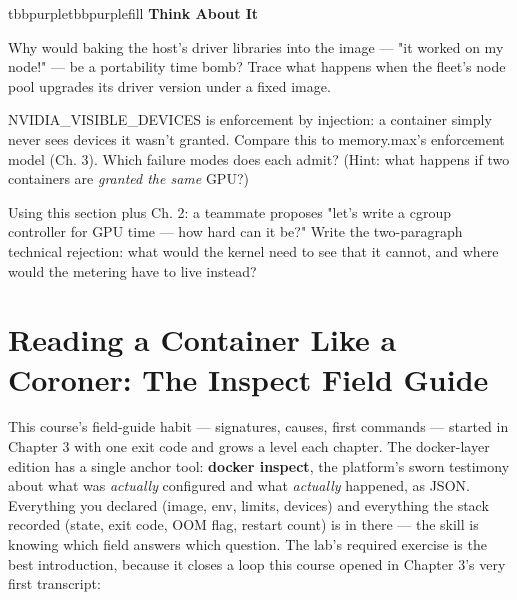 \begin{calloutbox}{tbbpurple}{tbbpurplefill}
{\normalsize\bfseries\color{tbbpurple}Think About It}\par\vspace{3pt}
\begin{tbbitemize}
  \item Why would baking the host's driver libraries into the image — "it worked on my node!" — be a portability time bomb? Trace what happens when the fleet's node pool upgrades its driver version under a fixed image.
  \item NVIDIA\_VISIBLE\_DEVICES is enforcement by injection: a container simply never sees devices it wasn't granted. Compare this to memory.max's enforcement model (Ch. 3). Which failure modes does each admit? (Hint: what happens if two containers are \textit{granted the same} GPU?)
  \item Using this section plus Ch. 2: a teammate proposes "let's write a cgroup controller for GPU time — how hard can it be?" Write the two-paragraph technical rejection: what would the kernel need to see that it cannot, and where would the metering have to live instead?
\end{tbbitemize}
\end{calloutbox}

\section{Reading a Container Like a Coroner: The Inspect Field Guide}

This course's field-guide habit — signatures, causes, first commands — started in Chapter 3 with one exit code and grows a level each chapter. The docker-layer edition has a single anchor tool: \textbf{docker inspect}, the platform's sworn testimony about what was \textit{actually} configured and what \textit{actually} happened, as JSON. Everything you declared (image, env, limits, devices) and everything the stack recorded (state, exit code, OOM flag, restart count) is in there — the skill is knowing which field answers which question. The lab's required exercise is the best introduction, because it closes a loop this course opened in Chapter 3's very first transcript:

